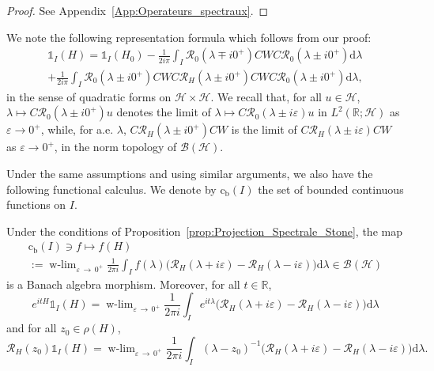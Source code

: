 \documentclass[10pt]{amsart}
\theoremstyle{definition}\newtheorem{defi}[theo]{Definition}\newtheorem{rema}[theo]{Remark}\newtheorem{exam}[theo]{Example}\newtheorem{exem}[theo]{Example}\newtheorem{nota}[theo]{Notation}
\newcommand{\Hi}{\mathcal{H}}
\newcommand{\R}{\mathbb{R}}
\newcommand{\rmc}{\mathrm{c}}
\newcommand{\rmd}{\mathrm{d}}
\newcommand{\rmb}{\mathrm{b}}
\newcommand{\Res}{\mathcal{R}}
\newcommand{\clB}{\mathcal{B}}
\DeclareMathOperator{\wlim}{w-lim}
\begin{document}
\begin{proof}
See Appendix~\ref{App:Operateurs_spectraux}.
\end{proof}

We note the following representation formula which follows from our proof:
\begin{multline}\label{eq:repres_1_I}
\mathds{1}_I(H) = \mathds{1}_I(H_0) - \frac{1}{2i\pi} \int_I \Res_{0}\left(\lambda\mp i0^+\right)CWC\Res_{0}\left(\lambda\pm i0^+\right) \rmd \lambda \\
+ \frac{1}{2i\pi} \int_I \Res_0\left(\lambda\pm i0^+\right) CWC\Res_H\left(\lambda\pm i0^+\right)CWC\Res_0\left(\lambda\pm i0^+\right) \rmd \lambda, 
\end{multline}
in the sense of quadratic forms on $\Hi\times\Hi$. We recall that, for all $u\in\Hi$, $\lambda\mapsto C\Res_0(\lambda\pm i0^+)u$ denotes the limit of $\lambda\mapsto C\Res_0(\lambda\pm i\varepsilon)u$ in $L^2(\R;\Hi)$ as $\varepsilon\to0^+$, while, for a.e. $\lambda$, $C\Res_H(\lambda\pm i0^+)CW$ is the limit of $C\Res_H(\lambda\pm i\varepsilon)CW$ as $\varepsilon\to0^+$, in the norm topology of $\clB(\Hi)$.


Under the same assumptions and using similar arguments, we also have the following functional calculus. We denote by $\rmc_{\rmb}(I)$ the set of bounded continuous functions on $I$.

\begin{prop}\label{prop:functional_calculus}
Under the conditions of Proposition~\ref{prop:Projection_Spectrale_Stone}, the map
\begin{multline}\label{eq:algebra_morphism}
\rmc_{\rmb}(I)\ni f\mapsto f(H)\\
:= \wlim_{\varepsilon\,\rightarrow\,0^+}\frac{1}{2\pi i}\int_If(\lambda)\big(\Res_{H}(\lambda+i\varepsilon)-\Res_{H}(\lambda-i\varepsilon)\big)\rmd \lambda\in\clB(\Hi)
\end{multline}
is a Banach algebra morphism. Moreover, for all $t\in\R$,
\begin{equation}\label{eq:Projection_spectral_calcul_fonctionnel_semi-group}
e^{itH}\mathds{1}_I(H)=\wlim_{\varepsilon\,\rightarrow\,0^+}\frac{1}{2\pi i}\int_I e^{it\lambda}\big(\Res_H(\lambda+i\varepsilon)-\Res_H(\lambda-i\varepsilon)\big)\rmd \lambda
\end{equation}
and for all $z_0\in\rho(H)$,
\begin{equation}\label{eq:Projection_spectral_calcul_fonctionnel_resolvent}
\Res_H(z_0)\mathds{1}_I(H)=\wlim_{\varepsilon\,\rightarrow\,0^+}\frac{1}{2\pi i}\int_I (\lambda-z_0)^{-1}\big(\Res_H(\lambda+i\varepsilon)-\Res_H(\lambda-i\varepsilon)\big)\rmd \lambda.
\end{equation}
\end{prop}
\end{document}
